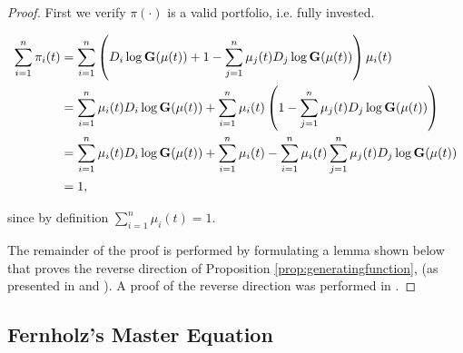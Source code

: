 \documentclass[british]{amsart} \usepackage{lmodern}
\numberwithin{equation}{section} \numberwithin{figure}{section}
\theoremstyle{plain} \newtheorem{thm}{\protect\theoremname}[section]
\theoremstyle{definition} \newtheorem{defn}[thm]{\protect\definitionname}
\theoremstyle{plain} \newtheorem{assumption}[thm]{\protect\assumptionname}
\theoremstyle{plain} \newtheorem{lem}[thm]{\protect\lemmaname}
\theoremstyle{plain} \newtheorem{prop}[thm]{\protect\propositionname}
\theoremstyle{remark} \newtheorem{rem}[thm]{\protect\remarkname}
\theoremstyle{plain} \newtheorem{cor}[thm]{\protect\corollaryname}
\begin{document}
\begin{proof}
  First we verify $\pi(\cdot)$ is a valid portfolio, i.e. fully invested.

   \begin{gather}
    \begin{split}
      \sum_{i=1}^{n} \pi_{i}(t) 
      &= \sum_{i=1}^{n} 
        \left( 
          D_{i}\log{\mathbf{G}(\mu(t))} + 1 - 
            \sum_{j=1}^{n} \mu_{j}(t)D_{j}\log{\mathbf{G}(\mu(t))}
        \right) \mu_{i}(t) \\
      &= 
        \sum_{i=1}^{n} \mu_{i}(t) D_{i}\log{\mathbf{G}(\mu(t))} + 
        \sum_{i=1}^{n} \mu_{i}(t)
        \left( 
          1 - \sum_{j=1}^{n} \mu_{j}(t)D_{j}\log{\mathbf{G}(\mu(t))}
        \right) \\
       &= 
        \sum_{i=1}^{n} \mu_{i}(t) D_{i}\log{\mathbf{G}(\mu(t))} + 
        \sum_{i=1}^{n} \mu_{i}(t) -
        \sum_{i=1}^{n} \mu_{i}(t) \sum_{j=1}^{n} \mu_{j}(t)D_{j}\log{\mathbf{G}(\mu(t))} \\
       &= 1,
    \end{split}
  \end{gather}

  since by definition $\sum_{i=1}^{n} \mu_{i}(t) = 1$.

  The remainder of the proof is performed by formulating a lemma shown below that
  proves the reverse direction of Proposition \ref{prop:generatingfunction}, (as
  presented in \cite{fernholz2009} and \cite{vervuurt2015}). A proof of the
  reverse direction was performed in \cite{fernholz1999pgf}. 

\end{proof}

\subsection{Fernholz's Master Equation}

\end{document}

